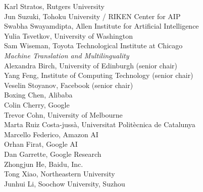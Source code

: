 \hspace*{0.2in} Karl Stratos, Rutgers University\\
\hspace*{0.2in} Jun Suzuki, Tohoku University / RIKEN Center for AIP\\
\hspace*{0.2in} Swabha Swayamdipta, Allen Institute for Artificial Intelligence\\
\hspace*{0.2in} Yulia Tsvetkov, University of Washington\\
\hspace*{0.2in} Sam Wiseman, Toyota Technological Institute at Chicago\\

\emph{Machine Translation and Multilinguality} \\
\hspace*{0.2in} Alexandra Birch, University of Edinburgh (senior chair)\\
\hspace*{0.2in} Yang Feng, Institute of Computing Technology (senior chair)\\
\hspace*{0.2in} Veselin Stoyanov, Facebook (senior chair)\\
\hspace*{0.2in} Boxing Chen, Alibaba\\
\hspace*{0.2in} Colin Cherry, Google\\
\hspace*{0.2in} Trevor Cohn, University of Melbourne\\
\hspace*{0.2in} Marta Ruiz Costa-jussà, Universitat Politècnica de Catalunya\\
\hspace*{0.2in} Marcello Federico, Amazon AI\\
\hspace*{0.2in} Orhan Firat, Google AI\\
\hspace*{0.2in} Dan Garrette, Google Research\\
\hspace*{0.2in} Zhongjun He, Baidu, Inc.\\
\hspace*{0.2in} Tong Xiao, Northeastern University\\
\hspace*{0.2in} Junhui Li, Soochow University, Suzhou\\

